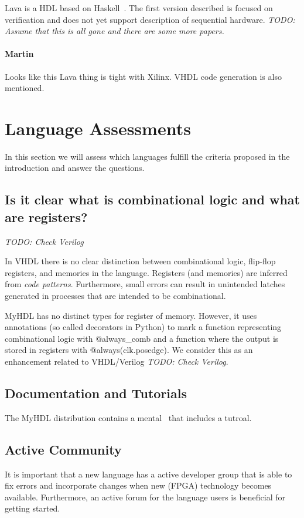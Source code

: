 \documentclass[10pt, conference, compsocconf]{IEEEtran}
\newcommand{\code}[1]{{\small{\textsf{#1}}}}
\newcommand{\todo}[1]{{\emph{TODO: #1}}}
\newcommand{\comment}[3]{\paragraph*{\textbf{#1}}{\color{#3}#2}}
\newcommand{\martin}[1]{\comment{Martin}{#1}{Blue}}
\begin{document}
Lava is a HDL based on Haskell~\cite{Lava:1998}. The first version described
is focused on verification and does not yet support description of sequential
hardware. \todo{Assume that this is all gone and there are some more papers.}

\martin{Looks like this Lava thing is tight with Xilinx. VHDL code generation
is also mentioned.}

\section{Language Assessments}

In this section we will assess which languages fulfill the criteria proposed in
the introduction and answer the questions.

\subsection{Is it clear what is combinational logic and what are registers?}

\todo{Check Verilog}

In VHDL there is no clear distinction between combinational logic, flip-flop
registers,  and memories in the language. Registers (and memories) are
inferred from \emph{code patterns}. Furthermore, small errors can result
in unintended latches generated in processes that are intended to be combinational.

MyHDL has no distinct types for register of memory. However, it uses annotations
(so called decorators in Python) to mark a function representing
combinational logic with \code{@always\_comb} and a function where the
output is stored in registers with \code{@always(clk.posedge)}. We consider
this as an enhancement related to VHDL/Verilog \todo{Check Verilog}.

\subsection{Documentation and Tutorials}

The MyHDL distribution contains a mental~\cite{myhdl:2010} that includes
a tutroal.

\subsection{Active Community}

It is important that a new language has a active developer group that is
able to fix errors and incorporate changes when new (FPGA) technology
becomes available. Furthermore, an active forum for the language users
is beneficial for getting started.
\end{document}
